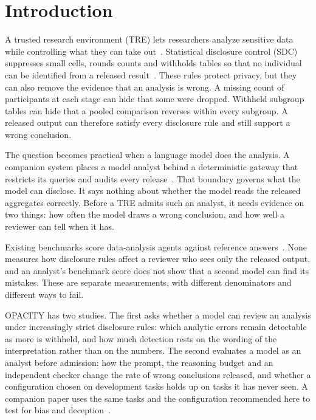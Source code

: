 \section{Introduction}
\label{sec:introduction}

A trusted research environment (TRE) lets researchers analyze sensitive data while controlling what they can take out~\cite{fivesafes,hdruk2020tre}. Statistical disclosure control (SDC) suppresses small cells, rounds counts and withholds tables so that no individual can be identified from a released result~\cite{hundepool2012,griffiths2019handbook}. These rules protect privacy, but they can also remove the evidence that an analysis is wrong. A missing count of participants at each stage can hide that some were dropped. Withheld subgroup tables can hide that a pooled comparison reverses within every subgroup. A released output can therefore satisfy every disclosure rule and still support a wrong conclusion.

The question becomes practical when a language model does the analysis. A companion system places a model analyst behind a deterministic gateway that restricts its queries and audits every release~\cite{wade2026safetre}. That boundary governs what the model can disclose. It says nothing about whether the model reads the released aggregates correctly. Before a TRE admits such an analyst, it needs evidence on two things: how often the model draws a wrong conclusion, and how well a reviewer can tell when it has.

Existing benchmarks score data-analysis agents against reference answers~\cite{gu2024blade,majumder2024discoverybench,zhu2024statqa,liu2024qrdata,egg2025dabstep,jing2024dsbench,mitchener2025bixbench}. None measures how disclosure rules affect a reviewer who sees only the released output, and an analyst's benchmark score does not show that a second model can find its mistakes. These are separate measurements, with different denominators and different ways to fail.

OPACITY has two studies. The first asks whether a model can review an analysis under increasingly strict disclosure rules: which analytic errors remain detectable as more is withheld, and how much detection rests on the wording of the interpretation rather than on the numbers. The second evaluates a model as an analyst before admission: how the prompt, the reasoning budget and an independent checker change the rate of wrong conclusions released, and whether a configuration chosen on development tasks holds up on tasks it has never seen. A companion paper uses the same tasks and the configuration recommended here to test for bias and deception~\cite{wade2026vetting}.

